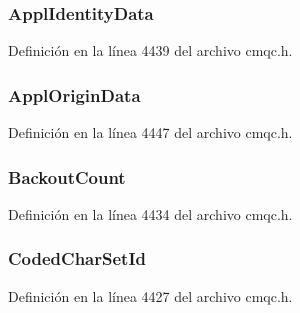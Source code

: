 \subsubsection[{Appl\+Identity\+Data}]{ Appl\+Identity\+Data}\label{structtag_m_q_m_d_a1f16948c5ba6adfbb92776400030700e}


Definición en la línea 4439 del archivo cmqc.\+h.

\hypertarget{structtag_m_q_m_d_aaf3c543f992b06c609193929872b998a}{}
\subsubsection[{Appl\+Origin\+Data}]{ Appl\+Origin\+Data}\label{structtag_m_q_m_d_aaf3c543f992b06c609193929872b998a}


Definición en la línea 4447 del archivo cmqc.\+h.

\hypertarget{structtag_m_q_m_d_afd269725e61f1620f8182ccd914d8dae}{}
\subsubsection[{Backout\+Count}]{ Backout\+Count}\label{structtag_m_q_m_d_afd269725e61f1620f8182ccd914d8dae}


Definición en la línea 4434 del archivo cmqc.\+h.

\hypertarget{structtag_m_q_m_d_a4d8d1961a991850d1355cdf9b4680b8e}{}
\subsubsection[{Coded\+Char\+Set\+Id}]{ Coded\+Char\+Set\+Id}\label{structtag_m_q_m_d_a4d8d1961a991850d1355cdf9b4680b8e}


Definición en la línea 4427 del archivo cmqc.\+h.

\hypertarget{structtag_m_q_m_d_acac8d73138c2c618b41a274eb92e5f2a}{}
